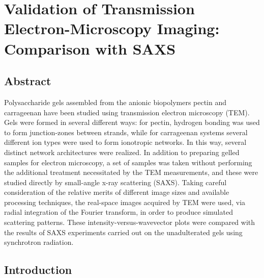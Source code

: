 
\chapter{Validation of Transmission Electron-Microscopy Imaging: Comparison with SAXS}

\label{Chapter-TEMSAXS} %


\section{Abstract}
\noindent
Polysaccharide gels assembled from the anionic biopolymers pectin and carrageenan have been studied using transmission electron microscopy (TEM). Gels were formed in several different ways: for pectin, hydrogen bonding was used to form junction-zones between strands, while for carrageenan systems several different ion types were used to form ionotropic networks. In this way, several distinct network architectures were realized. In addition to preparing gelled samples for electron microscopy, a set of samples was taken without performing the additional treatment necessitated by the TEM measurements, and these were studied directly by small-angle x-ray scattering (SAXS). Taking careful consideration of the relative merits of different image sizes and available processing techniques, the real-space images acquired by TEM were used, via radial integration of the Fourier transform, in order to produce simulated scattering patterns. These intensity-versus-wavevector plots were compared with the results of SAXS experiments carried out on the unadulterated gels using synchrotron radiation.

\section{Introduction}

